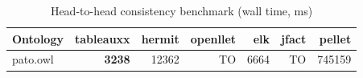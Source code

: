 \begin{table}[t]
\centering
\caption{Head-to-head consistency benchmark (wall time, ms)}
\label{tab:head_to_head_wall_ms}
\begin{tabular}{lrrrrrr}
\toprule
Ontology & tableauxx & hermit & openllet & elk & jfact & pellet \\
\midrule
pato.owl & \textbf{3238} & 12362 & TO & 6664 & TO & 745159 \\
\bottomrule
\end{tabular}
\end{table}
